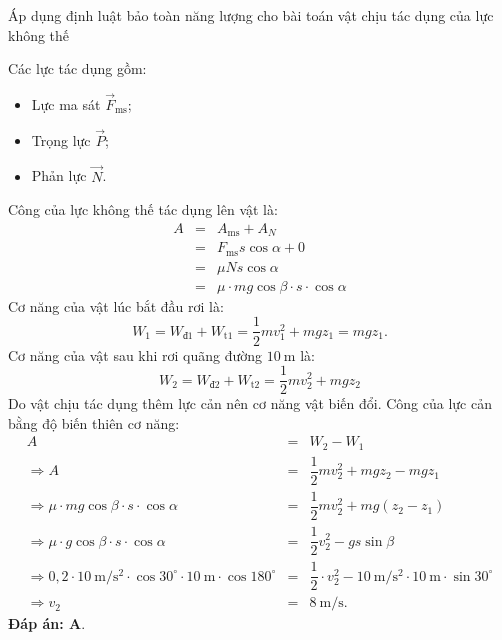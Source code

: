 \begin{dang}{Áp dụng định luật bảo toàn năng lượng cho bài toán vật chịu tác dụng của lực không thế}
{{			Các lực tác dụng gồm:
			\begin{itemize}
				\item Lực ma sát $\vec{F}_\text{ms}$;
				\item Trọng lực $\vec{P}$;
				\item Phản lực $\vec{N}$.
			\end{itemize}
			Công của lực không thế tác dụng lên vật là:
			\begin{eqnarray*}
				A&=&A_\text{ms}+A_N\\
				&=&F_\text{ms}s\cos\alpha+0\\
				&=&\mu N s\cos\alpha\\
				&=&\mu\cdot  mg\cos\beta \cdot s \cdot \cos\alpha
			\end{eqnarray*}
			Cơ năng của vật lúc bắt đầu rơi là:
			\begin{equation*}
				W_1=W_\text{đ1}+W_\text{t1}=\dfrac{1}{2}mv_1^2+mgz_1=mgz_1.
			\end{equation*}
			Cơ năng của vật sau khi rơi quãng đường $\SI{10}{\meter}$ là:
			\begin{equation*}
				W_2=W_\text{đ2}+W_\text{t2}=\dfrac{1}{2}mv_2^2+mgz_2
			\end{equation*}
			Do vật chịu tác dụng thêm lực cản nên cơ năng vật biến đổi. Công của lực cản bằng độ biến thiên cơ năng:
			\begin{eqnarray*}
				A&=&W_2-W_1\\
				\Rightarrow A &=& \dfrac{1}{2}mv_2^2+mgz_2 - mgz_1\\
				\Rightarrow \mu\cdot  mg\cos\beta \cdot s \cdot \cos\alpha &=& \dfrac{1}{2}mv_2^2+mg(z_2 - z_1)\\
				\Rightarrow \mu\cdot  g\cos\beta \cdot s \cdot \cos\alpha &=& \dfrac{1}{2}v_2^2 - g s\sin\beta\\
				\Rightarrow 0,2 \cdot \SI{10}{\meter/\second^2} \cdot \cos 30^\circ \cdot \SI{10}{\meter} \cdot \cos 180^\circ &=& \dfrac{1}{2}\cdot v_2^2 -\SI{10}{\meter/\second^2}\cdot \SI{10}{\meter} \cdot\sin30^\circ\\
				\Rightarrow v_2 &=& \SI{8}{\meter/\second}.
			\end{eqnarray*}
			\textbf{Đáp án: A}.}
	}
	{}
\end{dang}
